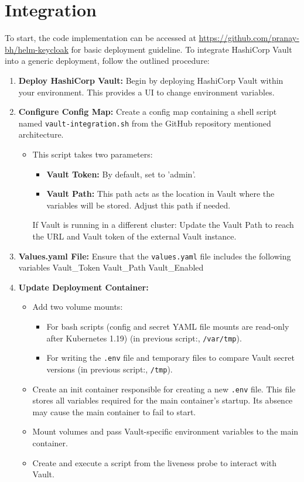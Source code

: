 \section{Integration}

To start, the code implementation can be accessed at \url{https://github.com/pranay-bh/helm-keycloak} for basic deployment guideline.
To integrate HashiCorp Vault into a generic deployment, follow the outlined procedure:

\begin{enumerate}
  \item \textbf{Deploy HashiCorp Vault:} Begin by deploying HashiCorp Vault within your environment. This provides a UI to change environment variables.
  
  \item \textbf{Configure Config Map:} Create a config map containing a shell script named \texttt{vault-integration.sh} from the GitHub repository mentioned architecture. 
  \begin{itemize}
    \item  This script takes two parameters:
    \begin{itemize}
      \item \textbf{Vault Token:} By default, set to 'admin'.
      \item \textbf{Vault Path:} This path acts as the location in Vault where the variables will be stored. Adjust this path if needed.
    \end{itemize}
    If Vault is running in a different cluster: Update the Vault Path to reach the URL and Vault token of the external Vault instance.
  \end{itemize}
  
  \item \textbf{Values.yaml File:} Ensure that the \texttt{values.yaml} file includes the following variables \newline
      Vault\_Token
      Vault\_Path
      Vault\_Enabled
  
  \item \textbf{Update Deployment Container:}
  \begin{itemize}
    \item Add two volume mounts:
    \begin{itemize}
      \item For bash scripts (config and secret YAML file mounts are read-only after Kubernetes 1.19) (in previous script:, \texttt{/var/tmp}).
      \item For writing the \texttt{.env} file and temporary files to compare Vault secret versions (in previous script:, \texttt{/tmp}).
    \end{itemize}
    \item Create an init container responsible for creating a new \texttt{.env} file. This file stores all variables required for the main container's startup. Its absence may cause the main container to fail to start.
    \item Mount volumes and pass Vault-specific environment variables to the main container.
    \item Create and execute a script from the liveness probe to interact with Vault.
  \end{itemize}
\end{enumerate}

